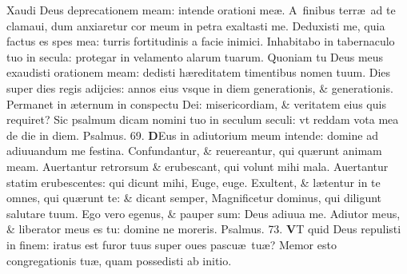 \documentclass[a5paper,10pt]{book}
\def\ae{æ}
\begin{document}
\begin{multicols*}{2}
Xaudi Deus deprecationem meam: intende orationi me\ae .
\newline \color{red} A\color{black}\ finibus terr\ae \ ad te clamaui, dum anxiaretur cor meum in petra exaltasti me.
\newline \color{red} D\color{black}eduxisti me, quia factus es spes mea: turris fortitudinis a facie inimici.
\newline \color{red} I\color{black}nhabitabo in tabernaculo tuo in secula: protegar in velamento alarum tuarum.
\newline \color{red} Q\color{black}uoniam tu Deus meus exaudisti orationem meam: dedisti h\ae reditatem timentibus nomen tuum.
\newline \color{red} D\color{black}ies super dies regis adijcies: annos eius vsque in diem generationis, \& generationis.
\newline \color{red} P\color{black}ermanet in \ae ternum in conspectu Dei: misericordiam, \& veritatem eius quis requiret?
\newline \color{red} S\color{black}ic psalmum dicam nomini tuo in seculum seculi: vt reddam vota mea de die in diem. \quad \color{red} Psalmus. \hypertarget{ps69}{69.} \color{black}
\vspace{-.5em}
\lettrine[lines=2]{\bfseries \color{red} D}{}Eus in adiutorium meum intende: domine ad adiuuandum me festina.
\newline \color{red} C\color{black}onfundantur, \& reuereantur, qui qu\ae runt animam meam.
\newline \color{red} A\color{black}uertantur retrorsum \& erubescant, qui volunt mihi mala.
\newline \color{red} A\color{black}uertantur statim erubescentes: qui dicunt mihi, Euge, euge.
\newline \color{red} E\color{black}xultent, \& l\ae tentur in te omnes, qui qu\ae runt te: \& dicant semper, Magnificetur dominus, qui diligunt salutare tuum.
\newline \color{red} E\color{black}go vero egenus, \& pauper sum: Deus adiuua me.
\newline \color{red} A\color{black}diutor meus, \& liberator meus es tu: domine ne moreris. \quad \color{red} Psalmus. \hypertarget{ps73}{73.} \color{black}
\vspace{-.5em}
\lettrine[lines=2]{\bfseries \color{red} V}{}T quid Deus repulisti in finem: iratus est furor tuus super oues pascu\ae \ tu\ae ?
\newline \color{red} M\color{black}emor esto congregationis tu\ae , quam possedisti ab initio.

\end{multicols*}
\end{document}
